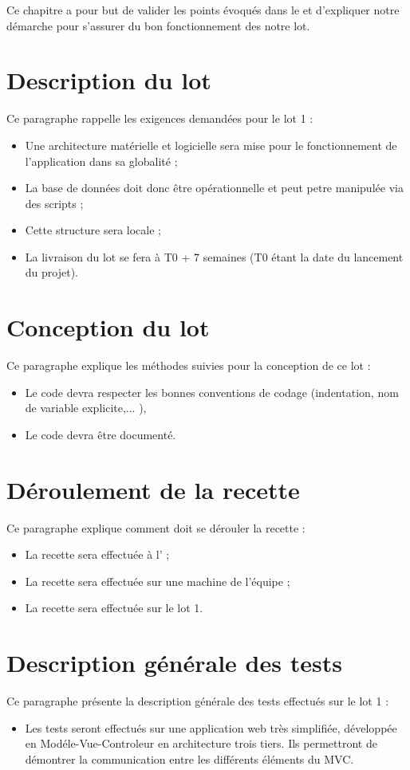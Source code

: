 	Ce chapitre a pour but de valider les points évoqués dans le \DSE{} et d'expliquer notre démarche pour s'assurer du bon fonctionnement des notre lot.
	
\section{Description du lot}
	Ce paragraphe rappelle les exigences demandées pour le lot 1 :
	\begin{itemize}
		\item Une architecture matérielle et logicielle sera mise pour le fonctionnement de l'application dans sa globalité ;
		\item La base de données doit donc être opérationnelle et peut petre manipulée via des scripts ;
		\item Cette structure sera locale ;
		\item La livraison du lot se fera à T0 + 7 semaines (T0 étant la date du lancement du projet).
	\end{itemize}
	
\section{Conception du lot}
	Ce paragraphe explique les méthodes suivies pour la conception de ce lot :
	\begin{itemize}
		\item Le code devra respecter les bonnes conventions de codage (indentation, nom de variable explicite,... ),
		\item Le code devra être documenté.
	\end{itemize}
	
\section{Déroulement de la recette}
	Ce paragraphe explique comment doit se dérouler la recette : 
	\begin{itemize}
		\item La recette sera effectuée à l'\INSA{} ;
		\item La recette sera effectuée sur une machine de l'équipe \nomEquipe{} ;
		\item La recette sera effectuée sur le lot 1.
	\end{itemize}

\section{Description générale des tests}
	Ce paragraphe présente la description générale des tests effectués sur le lot 1 :	
	\begin{itemize}
		\item Les tests seront effectués sur une application web très simplifiée, développée en Modéle-Vue-Controleur en architecture trois tiers. Ils permettront de démontrer la communication entre les différents éléments du MVC.
	\end{itemize}

